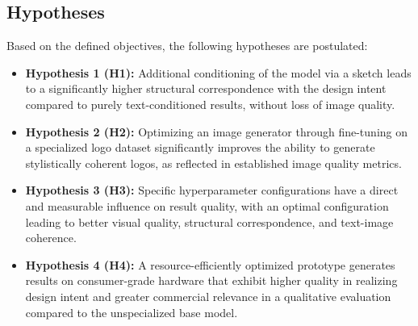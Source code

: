 \subsection{Hypotheses}
Based on the defined objectives, the following hypotheses are postulated:
\begin{itemize}
	\item \textbf{Hypothesis 1 (H1):} Additional conditioning of the model via a sketch leads to a significantly higher structural correspondence with the design intent compared to purely text-conditioned results, without loss of image quality.
	\item \textbf{Hypothesis 2 (H2):} Optimizing an image generator through fine-tuning on a specialized logo dataset significantly improves the ability to generate stylistically coherent logos, as reflected in established image quality metrics.
	\item \textbf{Hypothesis 3 (H3):} Specific hyperparameter configurations have a direct and measurable influence on result quality, with an optimal configuration leading to better visual quality, structural correspondence, and text-image coherence.
	\item \textbf{Hypothesis 4 (H4):} A resource-efficiently optimized prototype generates results on consumer-grade hardware that exhibit higher quality in realizing design intent and greater commercial relevance in a qualitative evaluation compared to the unspecialized base model.
\end{itemize}

